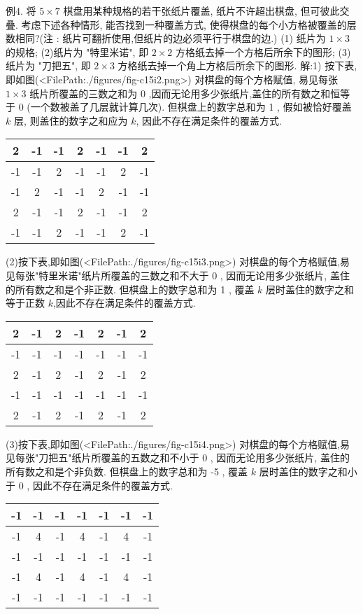 例4. 将 $5 \times 7$ 棋盘用某种规格的若干张纸片覆盖, 纸片不许超出棋盘, 但可彼此交叠.
考虑下述各种情形, 能否找到一种覆盖方式, 使得棋盘的每个小方格被覆盖的层数相同?(注 : 纸片可翻折使用,但纸片的边必须平行于棋盘的边.)
(1) 纸片为 $1 \times 3$ 的规格;
(2)纸片为 "特里米诺", 即 $2 \times 2$ 方格纸去掉一个方格后所余下的图形;
(3)纸片为 "刀把五", 即 $2 \times 3$ 方格纸去掉一个角上方格后所余下的图形.
解:1) 按下表,即如图(<FilePath:./figures/fig-c15i2.png>) 对棋盘的每个方格赋值, 易见每张 $1 \times 3$ 纸片所覆盖的三数之和为 0 ,因而无论用多少张纸片,盖住的所有数之和恒等于 0 (一个数被盖了几层就计算几次). 但棋盘上的数字总和为 1 , 假如被恰好覆盖 $k$ 层, 则盖住的数字之和应为 $k$, 因此不存在满足条件的覆盖方式.
\begin{tabular}{|c|c|c|c|c|c|c|}
\hline 2 & -1 & -1 & 2 & -1 & -1 & 2 \\
\hline-1 & -1 & 2 & -1 & -1 & 2 & -1 \\
\hline-1 & 2 & -1 & -1 & 2 & -1 & -1 \\
\hline 2 & -1 & -1 & 2 & -1 & -1 & 2 \\
\hline-1 & -1 & 2 & -1 & -1 & 2 & -1 \\
\hline
\end{tabular}
(2)按下表,即如图(<FilePath:./figures/fig-c15i3.png>) 对棋盘的每个方格赋值,易见每张"特里米诺"纸片所覆盖的三数之和不大于 0 , 因而无论用多少张纸片, 盖住的所有数之和是个非正数.
但棋盘上的数字总和为 1 , 覆盖 $k$ 层时盖住的数字之和等于正数 $k$,因此不存在满足条件的覆盖方式.
\begin{tabular}{|c|c|c|c|c|c|c|}
\hline 2 & -1 & 2 & -1 & 2 & -1 & 2 \\
\hline-1 & -1 & -1 & -1 & -1 & -1 & -1 \\
\hline 2 & -1 & 2 & -1 & 2 & -1 & 2 \\
\hline-1 & -1 & -1 & -1 & -1 & -1 & -1 \\
\hline 2 & -1 & 2 & -1 & 2 & -1 & 2 \\
\hline
\end{tabular}
(3)按下表,即如图(<FilePath:./figures/fig-c15i4.png>) 对棋盘的每个方格赋值,易见每张"刀把五"纸片所覆盖的五数之和不小于 0 , 因而无论用多少张纸片, 盖住的所有数之和是个非负数.
但棋盘上的数字总和为 -5 , 覆盖 $k$ 层时盖住的数字之和小于 0 , 因此不存在满足条件的覆盖方式.
\begin{tabular}{|c|c|c|c|c|c|c|}
\hline-1 & -1 & -1 & -1 & -1 & -1 & -1 \\
\hline-1 & 4 & -1 & 4 & -1 & 4 & -1 \\
\hline-1 & -1 & -1 & -1 & -1 & -1 & -1 \\
\hline-1 & 4 & -1 & 4 & -1 & 4 & -1 \\
\hline-1 & -1 & -1 & -1 & -1 & -1 & -1 \\
\hline
\end{tabular}
